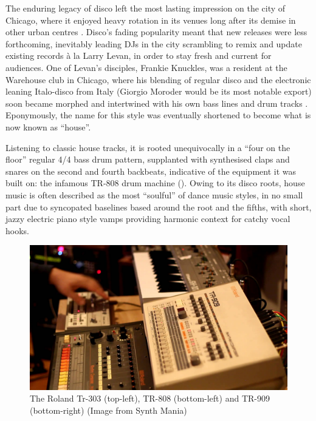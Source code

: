 The enduring legacy of disco left the most lasting impression on the city of Chicago, where it enjoyed heavy rotation in its venues long after its demise in other urban centres \citep{Reynolds2013}. Disco’s fading popularity meant that new releases were less forthcoming, inevitably leading DJs in the city scrambling to remix and update existing records à la Larry Levan, in order to stay fresh and current for audiences. One of Levan’s disciples, Frankie Knuckles, was a resident at the Warehouse club in Chicago, where his blending of regular disco and the electronic leaning Italo-disco from Italy (Giorgio Moroder would be its most notable export) soon became morphed and intertwined with his own bass lines and drum tracks \citep{Butler2006}. Eponymously, the name for this style was eventually shortened to become what is now known as ``house''.

Listening to classic house tracks, it is rooted unequivocally in a ``four on the floor'' regular 4/4 bass drum pattern, supplanted with synthesised claps and snares on the second and fourth backbeats, indicative of the equipment it was built on: the infamous TR-808 drum machine ()\citep{Blashill2002}. Owing to its disco roots, house music is often described as the most “soulful” of dance music styles, in no small part due to syncopated baselines based around the root and the fifths, with short, jazzy electric piano style vamps providing harmonic context for catchy vocal hooks.

\begin{figure}
	\begin{center}
		\includegraphics[width=\figSizeHundred]{ch02_dancemusic/figures/roland.jpg}
	\end{center}
	\caption[Roland electronic music instruments]{The Roland Tr-303 (top-left), TR-808 (bottom-left) and TR-909 (bottom-right) (Image from Synth Mania)}
	\label{fig:roland}
\end{figure}

